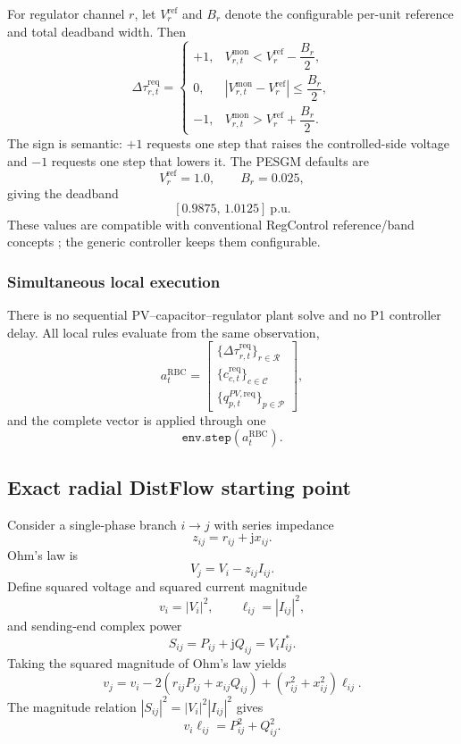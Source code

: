 For regulator channel $r$, let $V_r^{\mathrm{ref}}$ and $B_r$ denote the configurable
per-unit reference and total deadband width.  Then
\[
\Delta\tau_{r,t}^{\mathrm{req}}
=
\begin{cases}
+1,
&
V_{r,t}^{\mathrm{mon}}
<
V_r^{\mathrm{ref}}-\dfrac{B_r}{2},
\\[2mm]
0,
&
\left|
V_{r,t}^{\mathrm{mon}}-V_r^{\mathrm{ref}}
\right|
\le
\dfrac{B_r}{2},
\\[2mm]
-1,
&
V_{r,t}^{\mathrm{mon}}
>
V_r^{\mathrm{ref}}+\dfrac{B_r}{2}.
\end{cases}
\]
The sign is semantic: $+1$ requests one step that raises the controlled-side voltage and
$-1$ requests one step that lowers it.  The PESGM defaults are
\[
\boxed{
V_r^{\mathrm{ref}}=1.0,
\qquad
B_r=0.025,
}
\]
giving the deadband
\[
[0.9875,\,1.0125]\ \mathrm{p.u.}
\]
These values are compatible with conventional RegControl reference/band concepts
\cite{opendss_regcontrol}; the generic controller keeps them configurable.

\subsubsection{Simultaneous local execution}

There is no sequential PV--capacitor--regulator plant solve and no P1 controller delay.
All local rules evaluate from the same observation,
\[
a_t^{\mathrm{RBC}}
=
\begin{bmatrix}
\{\Delta\tau_{r,t}^{\mathrm{req}}\}_{r\in\mathcal R}\\
\{c_{c,t}^{\mathrm{req}}\}_{c\in\mathcal C}\\
\{q_{p,t}^{PV,\mathrm{req}}\}_{p\in\mathcal P}
\end{bmatrix},
\]
and the complete vector is applied through one
\[
\texttt{env.step}(a_t^{\mathrm{RBC}}).
\]

\subsection{Exact radial DistFlow starting point}
\label{subsec:p1_distflow}

Consider a single-phase branch $i\rightarrow j$ with series impedance
\[
z_{ij}=r_{ij}+\mathrm j x_{ij}.
\]
Ohm's law is
\[
V_j
=
V_i-z_{ij}I_{ij}.
\]
Define squared voltage and squared current magnitude
\[
v_i=|V_i|^2,
\qquad
\ell_{ij}=|I_{ij}|^2,
\]
and sending-end complex power
\[
S_{ij}
=
P_{ij}+\mathrm jQ_{ij}
=
V_iI_{ij}^{*}.
\]
Taking the squared magnitude of Ohm's law yields
\[
\boxed{
v_j
=
v_i
-
2\left(
r_{ij}P_{ij}
+
x_{ij}Q_{ij}
\right)
+
\left(
r_{ij}^{2}+x_{ij}^{2}
\right)\ell_{ij}.
}
\]
The magnitude relation $|S_{ij}|^2=|V_i|^2|I_{ij}|^2$ gives
\[
\boxed{
v_i\ell_{ij}
=
P_{ij}^2+Q_{ij}^2.
}
\]

